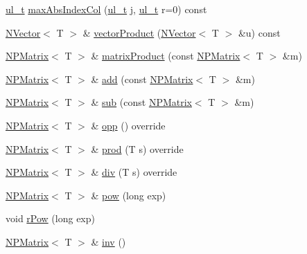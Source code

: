 \begin{DoxyCompactItemize}
\item 
\mbox{\hyperlink{group___n_algebra_ga1b140a2034db3f5dfe18a987745df43a}{ul\+\_\+t}} \mbox{\hyperlink{class_n_p_matrix_a2b5a2c3d646df900367ad91450d1ef33}{max\+Abs\+Index\+Col}} (\mbox{\hyperlink{group___n_algebra_ga1b140a2034db3f5dfe18a987745df43a}{ul\+\_\+t}} j, \mbox{\hyperlink{group___n_algebra_ga1b140a2034db3f5dfe18a987745df43a}{ul\+\_\+t}} r=0) const
\item 
\mbox{\hyperlink{class_n_vector}{N\+Vector}}$<$ T $>$ \& \mbox{\hyperlink{class_n_p_matrix_a8bb14c131409b94a8b52ec6a932098e5}{vector\+Product}} (\mbox{\hyperlink{class_n_vector}{N\+Vector}}$<$ T $>$ \&u) const
\item 
\mbox{\hyperlink{class_n_p_matrix}{N\+P\+Matrix}}$<$ T $>$ \& \mbox{\hyperlink{class_n_p_matrix_a79dfadc3945a91d9083af8da34b7412f}{matrix\+Product}} (const \mbox{\hyperlink{class_n_p_matrix}{N\+P\+Matrix}}$<$ T $>$ \&m)
\item 
\mbox{\hyperlink{class_n_p_matrix}{N\+P\+Matrix}}$<$ T $>$ \& \mbox{\hyperlink{class_n_p_matrix_a3f15ce97eeb7ddedac0741a5bdcf95c7}{add}} (const \mbox{\hyperlink{class_n_p_matrix}{N\+P\+Matrix}}$<$ T $>$ \&m)
\item 
\mbox{\hyperlink{class_n_p_matrix}{N\+P\+Matrix}}$<$ T $>$ \& \mbox{\hyperlink{class_n_p_matrix_adbaf5fc3417b46834bfb5392db7ef92b}{sub}} (const \mbox{\hyperlink{class_n_p_matrix}{N\+P\+Matrix}}$<$ T $>$ \&m)
\item 
\mbox{\hyperlink{class_n_p_matrix}{N\+P\+Matrix}}$<$ T $>$ \& \mbox{\hyperlink{class_n_p_matrix_a9b38999d88043fa71686351ded183de8}{opp}} () override
\item 
\mbox{\hyperlink{class_n_p_matrix}{N\+P\+Matrix}}$<$ T $>$ \& \mbox{\hyperlink{class_n_p_matrix_adb7ad767393a1fc0d240e1bb0c73b1f4}{prod}} (T s) override
\item 
\mbox{\hyperlink{class_n_p_matrix}{N\+P\+Matrix}}$<$ T $>$ \& \mbox{\hyperlink{class_n_p_matrix_a24b3fd013f74fdbde91f89095e9ca584}{div}} (T s) override
\item 
\mbox{\hyperlink{class_n_p_matrix}{N\+P\+Matrix}}$<$ T $>$ \& \mbox{\hyperlink{class_n_p_matrix_accdbb7d492c937deebe3812be136541c}{pow}} (long exp)
\item 
void \mbox{\hyperlink{class_n_p_matrix_a94145b4b25e9ce0be81417131d4072d5}{r\+Pow}} (long exp)
\item 
\mbox{\hyperlink{class_n_p_matrix}{N\+P\+Matrix}}$<$ T $>$ \& \mbox{\hyperlink{class_n_p_matrix_ac672c69c4b0ec298ac3e8326fcce48cb}{inv}} ()
\item 

\end{DoxyCompactItemize}
